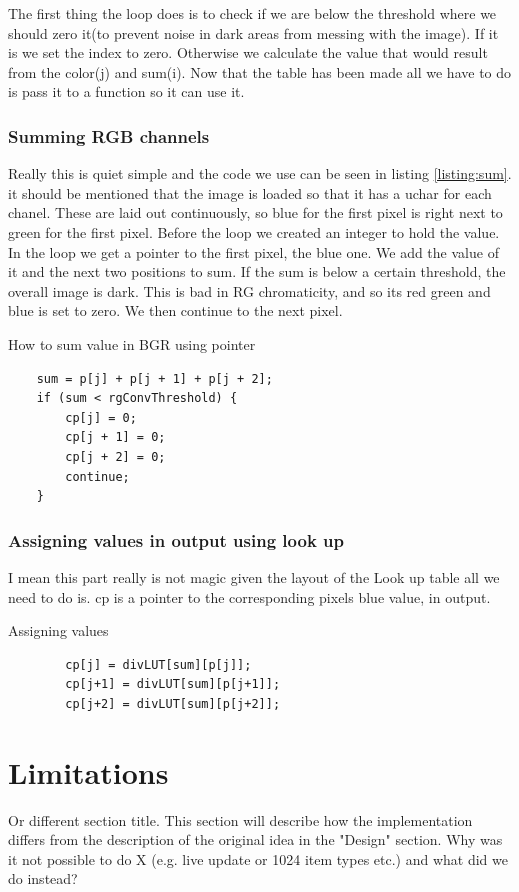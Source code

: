 The first thing the loop does is to check if we are below the threshold where we should zero it(to prevent noise in dark areas from messing with the image). If it is we set the index to zero. Otherwise we calculate the value that would result from the color(j) and sum(i).
Now that the table has been made all we have to do is pass it to a function so it can use it.

\subsubsection{Summing RGB channels}

Really this is quiet simple and the code we use can be seen in listing \ref{listing:sum}. it should be mentioned that the image is loaded so that it has a uchar for each chanel. These are laid out continuously, so blue for the first pixel is right next to green for the first pixel. Before the loop we created an integer to hold the value. In the loop we get a pointer to the first pixel, the blue one. We add the value of it and the next two positions to sum. If the sum is below a certain threshold, the overall image is dark. This is bad in RG chromaticity, and so its red green and blue is set to zero. We then continue to the next pixel.
\begin{listing}[H]
	\caption{How to sum value in BGR using pointer}
	\label{listing:sum}
	\begin{verbatim}
	sum = p[j] + p[j + 1] + p[j + 2];
	if (sum < rgConvThreshold) {
		cp[j] = 0;
		cp[j + 1] = 0;
		cp[j + 2] = 0;
		continue;
	}
	\end{verbatim}
\end{listing}
\subsubsection{Assigning values in output using look up}
I mean this part really is not  magic given the layout of the Look up table all we need to do is. cp is a pointer to the corresponding pixels blue value, in output.
\begin{listing}[H]
	\caption{Assigning values}
	\label{listing:sum}
	\begin{verbatim}
		cp[j] = divLUT[sum][p[j]];
		cp[j+1] = divLUT[sum][p[j+1]];
		cp[j+2] = divLUT[sum][p[j+2]];
	\end{verbatim}
\end{listing}


\section{Limitations}
Or different section title. This section will describe how the implementation differs from the description of the original idea in the "Design" section. Why was it not possible to do X (e.g. live update or 1024 item types etc.) and what did we do instead?